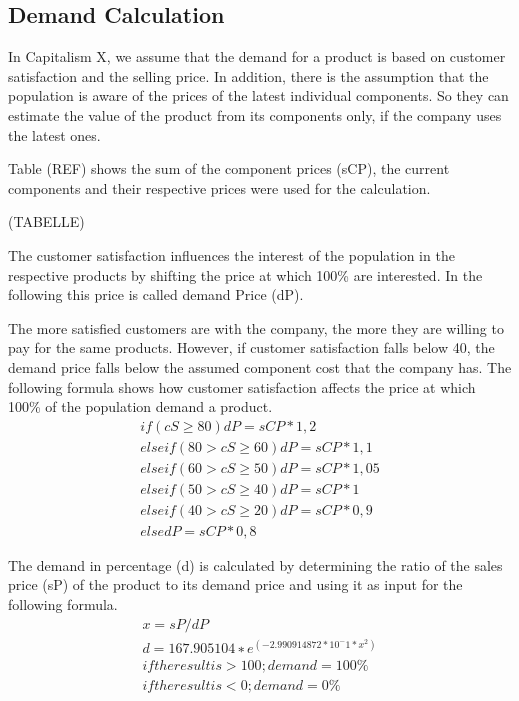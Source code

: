 \subsection{Demand Calculation}
In Capitalism X, we assume that the demand for a product is based on customer satisfaction and the selling price. In addition, there is the assumption that the population is aware of the prices of the latest individual components. So they can estimate the value of the product from its components only, if the company uses the latest ones.
 
Table (REF) shows the sum of the component prices (sCP), the current components and their respective prices were used for the calculation.
 
(TABELLE)
 
The customer satisfaction influences the interest of the population in the respective products by shifting the price at which 100\% are interested. In the following this price is called demand Price (dP).
 
The more satisfied customers are with the company, the more they are willing to pay for the same products. However, if customer satisfaction falls below 40, the demand price falls below the assumed component cost that the company has. The following formula shows how customer satisfaction affects the price at which 100\% of the population demand a product.
\begin{equation}
\begin{aligned}
if ( cS \geq 80 ) { dP = sCP * 1,2 } \\
elseif ( 80 > cS \geq 60 ){ dP = sCP * 1,1 } \\
elseif ( 60 > cS \geq 50 ) { dP = sCP * 1,05 } \\
elseif ( 50 > cS \geq 40 ) { dP = sCP * 1 } \\
elseif ( 40 > cS \geq 20 ) { dP = sCP * 0,9 } \\
else { dP = sCP * 0,8 }  
\end{aligned}
\end{equation}

The demand in percentage (d) is calculated by determining the ratio of the sales price (sP) of the product to its demand price and using it as input for the following formula.
\begin{equation}
\begin{aligned}
x = sP / dP \\
d = 167.905104 ∗e^ (−2.990914872 * 10^ -1 * x^2) \\
if the result is > 100; demand = 100\% \\
if the result is < 0; demand = 0\% \\    
\end{aligned}
\end{equation}
 
